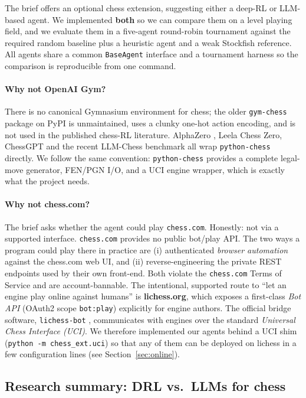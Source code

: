 \documentclass[11pt,a4paper]{article}
\begin{document}
The brief offers an optional chess extension, suggesting either a
deep-RL or LLM-based agent. We implemented \textbf{both} so we can
compare them on a level playing field, and we evaluate them in a
five-agent round-robin tournament against the required random
baseline plus a heuristic agent and a weak Stockfish reference. All
agents share a common \texttt{BaseAgent} interface and a tournament
harness so the comparison is reproducible from one command.

\paragraph{Why not OpenAI Gym?} There is no canonical Gymnasium
environment for chess; the older \texttt{gym-chess} package on PyPI is
unmaintained, uses a clunky one-hot action encoding, and is not used in
the published chess-RL literature. AlphaZero \cite{silver2018alphazero},
Leela Chess Zero, ChessGPT \cite{feng2023chessgpt} and the recent
LLM-Chess benchmark \cite{kolasani2025llmchess} all wrap
\texttt{python-chess} \cite{pythonchess} directly. We follow the same
convention: \texttt{python-chess} provides a complete legal-move
generator, FEN/PGN I/O, and a UCI engine wrapper, which is exactly
what the project needs.

\paragraph{Why not chess.com?} The brief asks whether the agent could
play \texttt{chess.com}. Honestly: not via a supported interface.
\texttt{chess.com} provides no public bot/play API. The two ways a
program could play there in practice are (i) authenticated
\emph{browser automation} against the chess.com web UI, and (ii)
reverse-engineering the private REST endpoints used by their own
front-end. Both violate the \texttt{chess.com} Terms of Service and are
account-bannable. The intentional, supported route to ``let an engine
play online against humans'' is \textbf{lichess.org}, which exposes a
first-class \emph{Bot API} (OAuth2 scope \texttt{bot:play}) explicitly
for engine authors. The official bridge software,
\texttt{lichess-bot} \cite{lichessbot}, communicates with engines over
the standard \emph{Universal Chess Interface (UCI)}. We therefore
implemented our agents behind a UCI shim
(\texttt{python -m chess\_ext.uci}) so that any of them can be
deployed on lichess in a few configuration lines (see
Section~\ref{sec:online}).

\subsection{Research summary: DRL vs.\ LLMs for chess}
\end{document}
